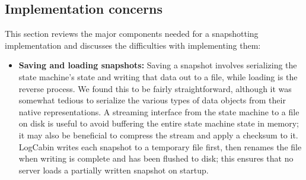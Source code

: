 %


\subsection{Implementation concerns}
\label{compaction:memsnapshot:implementation}

This section reviews the major components needed for a snapshotting
implementation and discusses the difficulties with implementing them:
%
\begin{itemize}
%
\item \textbf{Saving and loading snapshots:}
%
Saving a snapshot involves serializing the state machine's state and
writing that data out to a file, while loading is the reverse process.
We found this to be fairly straightforward, although it was somewhat
tedious to serialize the various types of data objects from their native
representations. A streaming interface from the state machine to a file
on disk is useful to avoid buffering the entire state machine state in
memory; it may also be beneficial to compress the stream and apply a
checksum to it.
LogCabin writes each snapshot to a temporary file first, then renames
the file when writing is complete and has been flushed to disk; this
ensures that no server loads a partially written snapshot on startup.


\end{itemize}
